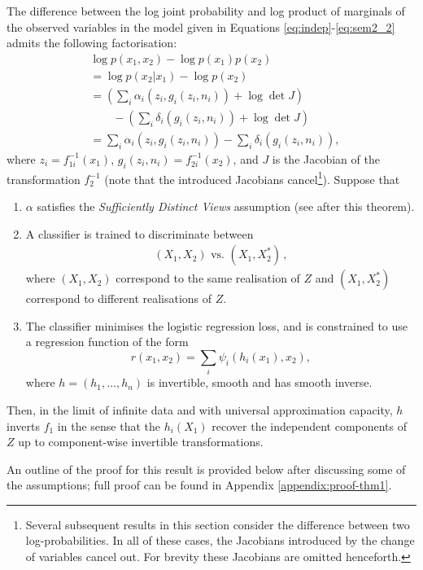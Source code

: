 \begin{theorem}
	\label{thm:noiseless1}
	The difference between the log joint probability and log product of marginals of the observed variables in the model given in Equations \ref{eq:indep}-\ref{eq:sem2_2} admits the following factorisation:
	\begin{align}
	&\log p({x}_1, {x}_2) - \log p({x}_1) p({x}_2) \nonumber \\
	&= \log p({x}_2 | {x}_1) - \log p({x}_2) \nonumber\\
	&= \left(\sum_i \alpha_i(z_{i}, g_i(z_i, n_i)) + \log \det J \right) \nonumber\\
	&\qquad - \left( \sum_i \delta_i(g_i(z_i, n_i)) + \log \det J\right) \nonumber\\
	&= \sum_i \alpha_i(z_{i}, g_i(z_i, n_i)) - \sum_i \delta_i(g_i(z_i, n_i)), \label{eq:logdens_noiesless_1} \,
	\end{align}
	where $z_i=f^{-1}_{1i}({x}_1)$, $g_i(z_i, n_i)=f^{-1}_{2i}({x}_2)$,
	and $J$ is the Jacobian of the transformation $f^{-1}_2$ (note that the introduced Jacobians cancel\footnote{Several subsequent results in this section consider the difference between two log-probabilities.
In all of these cases, the Jacobians introduced by the change of variables cancel out.
For brevity these Jacobians are omitted henceforth.}).
	Suppose that
	\begin{enumerate}
		\item $\alpha$ satisfies the \emph{Sufficiently Distinct Views} assumption (see after this theorem).
		\item A classifier is trained to discriminate between
		\begin{align*}
		(X_{1},X_{2}) \text{ vs. } (X_{1},X_{2}^{*})\,,
		\end{align*}
		where $({X}_{1},{X}_{2})$ correspond to the same realisation of $Z$ and $({X}_{1},{X}_{2}^{*})$ correspond to different realisations of ${Z}$.
		\item The classifier minimises the logistic regression loss, and is constrained to use a regression function of the form
		\begin{equation*}
		r({x}_{1},{x}_{2})=\sum_{i}\psi_{i}(h_{i}({x}_{1}),{x}_{2}),
		\end{equation*}
		where ${h} =(h_{1}, \ldots, h_{n})$  is invertible, smooth and has smooth inverse.
	\end{enumerate}
	
	Then, in the limit of infinite data and with universal approximation capacity, $h$ inverts ${f}_1$ in the sense that the $h_{i}(X_1)$ recover the independent components of $Z$ up to component-wise invertible transformations.
\end{theorem}
An outline of the proof for this result is provided below after discussing some of the assumptions; full proof can be found in Appendix \ref{appendix:proof-thm1}.

